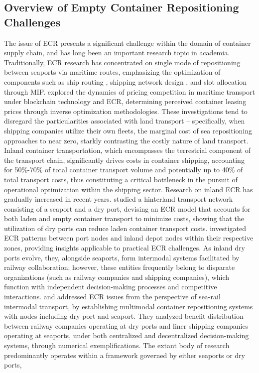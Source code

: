 \documentclass[preprint,12pt]{elsarticle}
\begin{document}
\subsection{Overview of Empty Container Repositioning Challenges}

The issue of ECR presents a significant challenge within the domain of container supply chain, and has long been an important research topic in academia. Traditionally, ECR research has concentrated on single mode of repositioning between seaports via maritime routes, emphasizing the optimization of components such as ship routing \cite{xiangLinerFleetDeployment2024,xiangTacticalVesselDeployment2024,xuEmptyContainerRepositioning2024}, shipping network design \cite{kuzmiczContainerDepotLocation2020, shanExactAlgorithmInland2020, zhangTacticalOperationalCooperative2019}, and slot allocation \cite{liangDynamicContainerSlot2024} through MIP. \cite{yuPricingCompetitionMaritime2024} explored the dynamics of pricing competition in maritime transport under blockchain technology and ECR, determining perceived container leasing prices through inverse optimization methodologies. These investigations tend to disregard the particularities associated with land transport – specifically, when shipping companies utilize their own fleets, the marginal cost of sea repositioning approaches to near zero, starkly contrasting the costly nature of land transport. Inland container transportation, which encompasses the terrestrial component of the transport chain, significantly drives costs in container shipping, accounting for 50\%-70\% of total container transport volume and potentially up to 40\% of total transport costs, thus constituting a critical bottleneck in the pursuit of operational optimization within the shipping sector. Research on inland ECR has gradually increased in recent years. \cite{faziMultitripContainerDrayage2023} studied a hinterland transport network consisting of a seaport and a dry port, devising an ECR model that accounts for both laden and empty container transport to minimize costs, showing that the utilization of dry ports can reduce laden container transport costs. \cite{caiJointOptimizationEmpty2024} investigated ECR patterns between port nodes and inland depot nodes within their respective zones, providing insights applicable to practical ECR challenges. As inland dry ports evolve, they, alongside seaports, form intermodal systems facilitated by railway collaboration; however, these entities frequently belong to disparate organizations (such as railway companies and shipping companies), which function with independent decision-making processes and competitive interactions. \cite{luoEmptyContainerRepositioning2019} and \cite{xieEmptyContainerManagement2017} addressed ECR issues from the perspective of sea-rail intermodal transport, by establishing multimodal container repositioning systems with nodes including dry port and seaport. They analyzed benefit distribution between railway companies operating at dry ports and liner shipping companies operating at seaports, under both centralized and decentralized decision-making systems, through numerical exemplifications. The extant body of research predominantly operates within a framework governed by either seaports or dry ports, 
\end{document}
